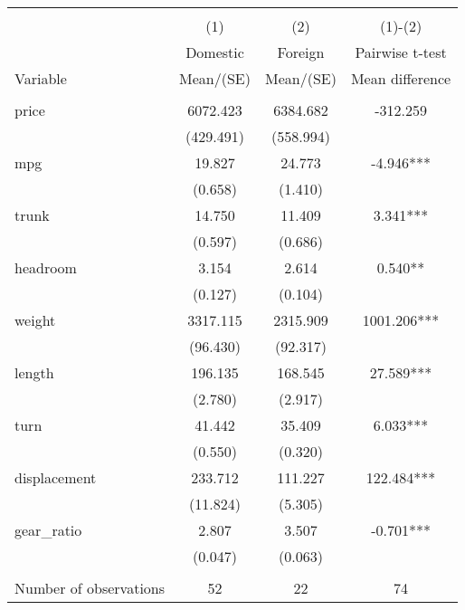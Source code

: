 
\begin{tabular}{@{\extracolsep{5pt}}lccc}
\\[-1.8ex]\hline \hline \\[-1.8ex]
 & \multicolumn{1}{c}{(1)}  & \multicolumn{1}{c}{(2)}  & \multicolumn{1}{c}{(1)-(2)} \\
 & \multicolumn{1}{c}{Domestic}  & \multicolumn{1}{c}{Foreign}  & \multicolumn{1}{c}{Pairwise t-test}  \\
Variable & Mean/(SE) & Mean/(SE) & Mean difference \\ \hline \\[-1.8ex] 
price   & 6072.423    & 6384.682    & -312.259   \\
 & (429.491)  & (558.994)  &  \\ [1ex]
mpg   & 19.827    & 24.773    & -4.946***   \\
 & (0.658)  & (1.410)  &  \\ [1ex]
trunk   & 14.750    & 11.409    & 3.341***   \\
 & (0.597)  & (0.686)  &  \\ [1ex]
headroom   & 3.154    & 2.614    & 0.540**   \\
 & (0.127)  & (0.104)  &  \\ [1ex]
weight   & 3317.115    & 2315.909    & 1001.206***   \\
 & (96.430)  & (92.317)  &  \\ [1ex]
length   & 196.135    & 168.545    & 27.589***   \\
 & (2.780)  & (2.917)  &  \\ [1ex]
turn   & 41.442    & 35.409    & 6.033***   \\
 & (0.550)  & (0.320)  &  \\ [1ex]
displacement   & 233.712    & 111.227    & 122.484***   \\
 & (11.824)  & (5.305)  &  \\ [1ex]
gear\_ratio   & 2.807    & 3.507    & -0.701***   \\
 & (0.047)  & (0.063)  &  \\ [1ex]
\hline \\[-1.8ex]
Number of observations  & 52   & 22  & 74  \\

\end{tabular}
